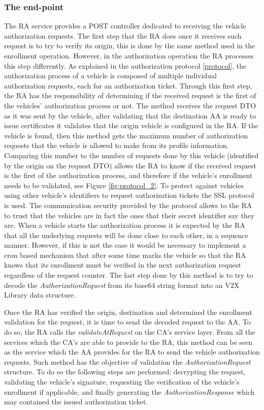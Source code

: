 \subsubsection{The end-point}
The RA service provides a POST controller dedicated to receiving the vehicle authorization requests. The first step that the RA does once it receives such request is to try to verify its origin, this is done by the same  method used in the enrollment operation. However, in the authorization operation the RA processes this step differently. As explained in the authorization protocol \ref{protocol}, the authorization process of a vehicle is composed of multiple individual authorization requests, each for an authorization ticket. Through this first step, the RA has the responsibility of determining if the received request is the first of the vehicles' authorization process or not. The  method receives the request DTO as it was sent by the vehicle, after validating that the destination AA is ready to issue certificates it validates that the origin vehicle is configured in the RA. If the vehicle is found, then this method gets the maximum number of authorization requests that the vehicle is allowed to make from its profile information. Comparing this number to the number of requests done by this vehicle (identified by the origin on the request DTO) allows the RA to know if the received request is the first of the authorization process, and therefore if the vehicle's enrollment needs to be validated, see Figure \ref{fig:protocol_2}. To protect against vehicles using other vehicle's identifiers to request authorization tickets the SSL protocol is used. The communication security provided by the protocol allows to the RA to trust that the vehicles are in fact the ones that their secret identifier say they are. When a vehicle starts the authorization process it is expected by the RA that all the underlying requests will be done close to each other, in a sequence manner. However, if this is not the case it would be necessary to implement a cron based mechanism that after some time marks the vehicle so that the RA knows that its enrollment must be verified in the next authorization request regardless of the request counter. The last step done by this method is to try to decode the \textit{AuthorizationRequest} from its base64 string format into an V2X Library data structure. 


Once the RA has verified the origin, destination and determined the enrollment validation for the request, it is time to send the decoded request to the AA. To do so, the RA calls the \textit{validateAtRequest} on the CA's service layer. From all the services which the CA's are able to provide to the RA, this method can be seen as the service which the AA provides for the RA to send the vehicle authorization requests. Such method has the objective of validation the \textit{AuthorizationRequest} structure. To do so the following steps are performed: decrypting the request, validating the vehicle's signature, requesting the verification of the vehicle's enrollment if applicable, and finally generating the \textit{AuthorizationResponse} which may contained the issued authorization ticket.


